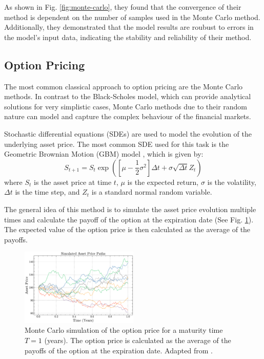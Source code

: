 \documentclass[prx,twocolumn,floatfix,superscriptaddress,longbibliography]{revtex4-1}
\begin{document}
As shown in Fig. \ref{fig:monte-carlo}, they found that the convergence of their method is dependent on the number of samples used in the Monte Carlo method. Additionally, they demonstrated that the model results 
are roubust to errors in the model's input data, indicating the stability and reliability of their method.

\subsection{Option Pricing}

 The most common classical approach to option pricing are the Monte Carlo methods. In contrast to the Black-Scholes model, which can provide 
 analytical solutions for very simplistic cases, Monte Carlo methods due to their random nature can model and capture the 
 complex behaviour of the financial markets. 

Stochastic differential equations (SDEs) are used to model the evolution of the underlying asset price. The most common SDE used for this task is the Geometric Brownian Motion (GBM) model \cite{Sood2019}, which is given by:
\begin{equation}
  \label{eq:20}
  S_{t+1} = S_t \exp\left(\left[\mu - \frac{1}{2}\sigma^2\right]\Delta t + \sigma \sqrt{\Delta t}Z_t\right)
\end{equation}
where $S_t$ is the asset price at time $t$, $\mu$ is the expected return, $\sigma$ is the volatility, $\Delta t$ is the time step, and $Z_t$ is a standard normal random variable.

The general idea of this method is to simulate the asset price evolution multiple times and calculate the payoff of the option at the expiration date (See Fig. \ref{fig:monte-carlo-option}). The expected value of the option price is then calculated as the average of the payoffs.
\begin{figure}[h!]
\centering
\includegraphics[width=0.5\textwidth]{monte-carlo-paths.pdf}
  \caption{\label{fig:monte-carlo-option} Monte Carlo simulation of the option price for a maturity time $T =1$ (years). The option price is calculated as the average of the payoffs of the option at the expiration date. Adapted from \cite{Sood2019}.}
\end{figure}
\end{document}
